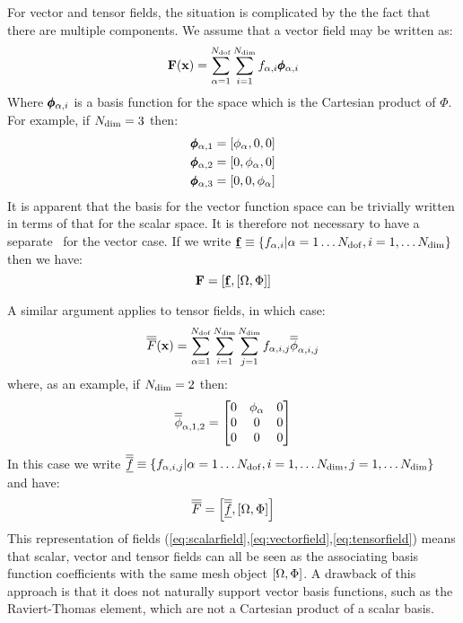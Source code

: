 \documentclass[a4paper, 11pt]{book}
\begin{document}
For vector and tensor fields, the situation is complicated by the the fact
that there are multiple components. We assume that a vector field may be
written as:
\begin{equation}
  \mathbf{F}(\mathbf{x})=\sum_{\alpha=1}^{N_\mathrm{dof}}\sum_{i=1}^{N_\mathrm{dim}} f_{\alpha,i}\pmb{\phi}_{\alpha,i}
\end{equation}
Where $\pmb{\phi}_{\alpha,i}$ is a basis function for
the space which is the Cartesian product of $\Phi$. For example, if
$N_\mathrm{dim}=3$ then:
\begin{gather}
  \pmb{\phi}_{\alpha,1}=[\phi_\alpha, 0, 0]\\
  \pmb{\phi}_{\alpha,2}=[0, \phi_\alpha, 0]\\
  \pmb{\phi}_{\alpha,3}=[0, 0, \phi_\alpha]
\end{gather}
It is apparent that the basis for the vector function space can be
trivially written in terms of that for the scalar space. It is therefore not
necessary to have a separate \meshtype\ for the vector case. If we write
$\underline{\mathbf{f}}\equiv\{f_{\alpha,i}|\alpha=1\ldots N_\mathrm{dof}, i=1,\ldots N_\mathrm{dim}\}$ then
we have:
\begin{equation}\label{eq:vectorfield}
  \mathbf{F}=\left[\underline{\mathbf{f}},[\Omega,\Phi]\right]
\end{equation}

A similar argument applies to tensor fields, in which case:
\begin{equation}
  \overline{\overline{F}}(\mathbf{x})=\sum_{\alpha=1}^{N_\mathrm{dof}} \sum_{i=1}^{N_\mathrm{dim}}\sum_{j=1}^{N_\mathrm{dim}}
  f_{\alpha,i,j}\overline{\overline{\phi}}_{\alpha,i,j}
\end{equation}
where, as an example, if $N_\mathrm{dim}=2$ then:
\begin{equation}
  \overline{\overline{\phi}}_{\alpha, 1, 2}=
  \begin{bmatrix}
    0 & \phi_\alpha & 0\\
    0 & 0 & 0\\
    0 & 0 & 0
  \end{bmatrix}
\end{equation}
In this case we write $\underline{\overline{\overline{f}}}\equiv\{f_{\alpha,i,j}|\alpha=1\ldots
N_\mathrm{dof}, i=1,\ldots N_\mathrm{dim}, j=1,\ldots N_\mathrm{dim}\}$ and have:
\begin{equation}\label{eq:tensorfield}
  \overline{\overline{F}}=\left[\underline{\overline{\overline{f}}},[\Omega,\Phi]\right]
\end{equation}
This representation of fields
(\ref{eq:scalarfield},\ref{eq:vectorfield},\ref{eq:tensorfield}) means that
scalar, vector and tensor fields can all be seen as the associating basis
function coefficients with the same mesh object $[\Omega,\Phi]$. A drawback
of this approach is that it does not naturally support vector basis
functions, such as the Raviert-Thomas element, which are not a Cartesian
product of a scalar basis.
\end{document}
